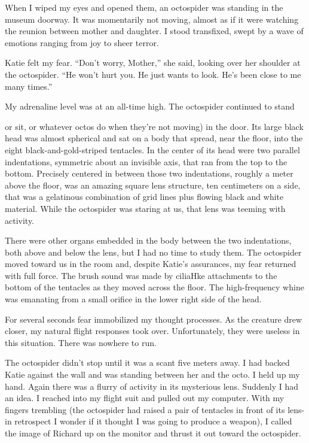 \documentclass[]{article}
\begin{document}
When I wiped my eyes and opened them, an octospider was standing in the museum doorway.  It was momentarily not moving, almost as if it were watching the reunion between mother and daughter.  I stood transfixed, swept by a wave of emotions ranging from joy to sheer terror.

Katie felt my fear.  “Don’t worry, Mother,” she said, looking over her shoulder at the octospider.  “He won’t hurt you.  He just wants to look.  He’s been close to me many times.”

My adrenaline level was at an all-time high.  The octospider continued to stand {or sit, or whatever octos do when they’re not moving) in the door.  Its large black head was almost spherical and sat on a body that spread, near the floor, into the eight black-and-gold-striped tentacles.  In the center of its head were two parallel indentations, symmetric about an invisible axis, that ran from the top to the bottom.  Precisely centered in between those two indentations, roughly a meter above the floor, was an amazing square lens structure, ten centimeters on a side, that was a gelatinous combination of grid lines plus flowing black and white material.  While the octospider was staring at us, that lens was teeming with activity.

There were other organs embedded in the body between the two indentations, both above and below the lens, but I had no time to study them.  The octospider moved toward us in the room and, despite Katie’s assurances, my fear returned with full force.  The brush sound was made by ciliaHke attachments to the bottom of the tentacles as they moved across the floor.  The high-frequency whine was emanating from a small orifice in the lower right side of the head.

For several seconds fear immobilized my thought processes.  As the creature drew closer, my natural flight responses took over.  Unfortunately, they were useless in this situation.  There was nowhere to run.

The octospider didn’t stop until it was a scant five meters away.  I had backed Katie against the wall and was standing between her and the octo.  I held up my hand.  Again there was a flurry of activity in its mysterious lens.  Suddenly I had an idea.  I reached into my flight suit and pulled out my computer.  With my fingers trembling (the octospider had raised a pair of tentacles in front of its lens-in retrospect I wonder if it thought I was going to produce a weapon), I called the image of Richard up on the monitor and thrust it out toward the octospider.

}
\end{document}
